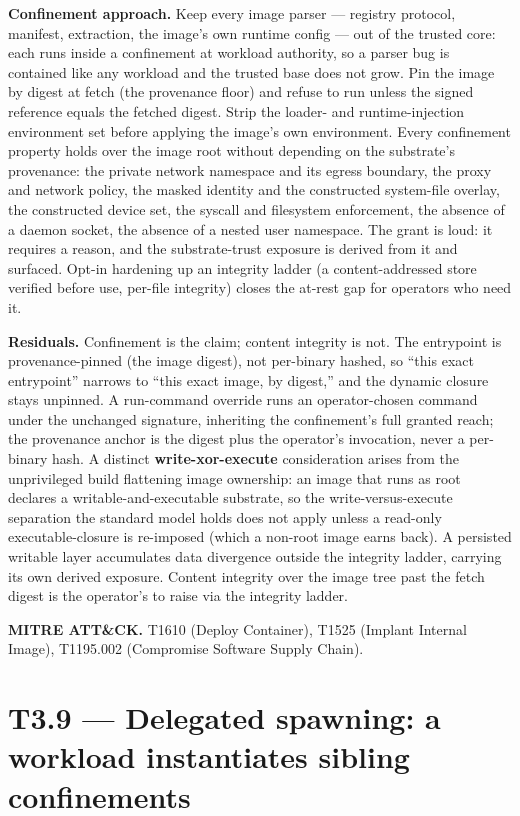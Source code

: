 \textbf{Confinement approach.} Keep every image parser --- registry
protocol, manifest, extraction, the image's own runtime config --- out
of the trusted core: each runs inside a confinement at workload
authority, so a parser bug is contained like any workload and the
trusted base does not grow. Pin the image by digest at fetch (the
provenance floor) and refuse to run unless the signed reference equals
the fetched digest. Strip the loader- and runtime-injection environment
set before applying the image's own environment. Every confinement
property holds over the image root without depending on the substrate's
provenance: the private network namespace and its egress boundary, the
proxy and network policy, the masked identity and the constructed
system-file overlay, the constructed device set, the syscall and
filesystem enforcement, the absence of a daemon socket, the absence of a
nested user namespace. The grant is loud: it requires a reason, and the
substrate-trust exposure is derived from it and surfaced. Opt-in
hardening up an integrity ladder (a content-addressed store verified
before use, per-file integrity) closes the at-rest gap for operators who
need it.

\textbf{Residuals.} Confinement is the claim; content integrity is not.
The entrypoint is provenance-pinned (the image digest), not per-binary
hashed, so ``this exact entrypoint'' narrows to ``this exact image, by
digest,'' and the dynamic closure stays unpinned. A run-command override
runs an operator-chosen command under the unchanged signature,
inheriting the confinement's full granted reach; the provenance anchor
is the digest plus the operator's invocation, never a per-binary hash. A
distinct \textbf{write-xor-execute} consideration arises from the
unprivileged build flattening image ownership: an image that runs as
root declares a writable-and-executable substrate, so the
write-versus-execute separation the standard model holds does not apply
unless a read-only executable-closure is re-imposed (which a non-root
image earns back). A persisted writable layer accumulates data
divergence outside the integrity ladder, carrying its own derived
exposure. Content integrity over the image tree past the fetch digest is
the operator's to raise via the integrity ladder.

\textbf{MITRE ATT\&CK.} T1610 (Deploy Container), T1525 (Implant
Internal Image), T1195.002 (Compromise Software Supply Chain).

\hypertarget{t3.9-delegated-spawning-a-workload-instantiates-sibling-confinements}{%
\section{T3.9 --- Delegated spawning: a workload instantiates sibling
confinements}\label{t3.9-delegated-spawning-a-workload-instantiates-sibling-confinements}}

